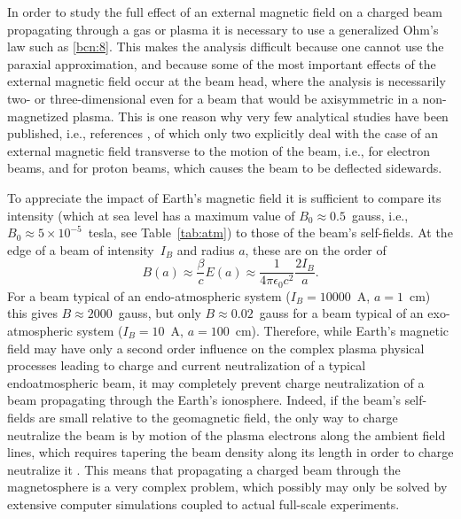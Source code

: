 \documentclass [12pt,a4paper,     ]{report} %
\begin{document}
   In order to study the full effect of an external magnetic field on a charged beam propagating through a gas or plasma it is necessary to  use a generalized Ohm's law such as \eqref{bcn:8}.  This makes the analysis difficult because one cannot use the paraxial approximation, and because some of the most important effects of the external magnetic field occur at the beam head, where the analysis is necessarily two- or three-dimensional even for a beam that would be axisymmetric in a non-magnetized plasma.  This is one reason why very few analytical studies have been published, i.e., references \cite{LEE--1971-, ROSIN1973-, CHU--1973-, BERK-1976-, CHRIE1986-}, of which only two explicitly deal with the case of an external magnetic field transverse to the motion of the beam, i.e., \cite{LEE--1971-} for electron beams, and \cite{CHRIE1986-} for proton beams, which causes the beam to be deflected sidewards. 

    To appreciate the impact of Earth's magnetic field it is sufficient to compare its intensity (which at sea level has a maximum value of $B_0 \approx 0.5$~gauss, i.e.,  $B_0 \approx 5\times 10^{-5}$~tesla, see Table~\ref{tab:atm}) to those of the beam's self-fields.  At the edge of a beam of intensity~$I_B$ and radius $a$, these are on the order of
%
\begin{equation}\label{mag:1} %
            B(a) \approx \frac{\beta}{c} E(a) 
                 \approx \frac{1}{4\pi\epsilon_0 c^2}\frac{2I_B}{a}.
\end{equation}
%
For a beam typical of an endo-atmospheric system ($I_B=10000$~A, $a=1$~cm) this gives $B \approx 2000$~gauss, but only  $B \approx 0.02$~gauss for a beam typical of an exo-atmospheric system ($I_B=10$~A, $a=100$~cm).  Therefore, while Earth's magnetic field may have only a second order influence on the complex plasma physical processes leading to charge and current neutralization of a typical endoatmospheric beam, it may completely prevent charge neutralization of a beam propagating through the Earth's ionosphere.  Indeed, if the beam's self-fields are small relative to the geomagnetic field, the only way to charge neutralize the beam is by motion of the plasma electrons along the ambient field lines, which requires tapering the beam density along its length in order to charge neutralize it \cite{CHRIE1986-}.  This means that propagating a charged beam through the magnetosphere is a very complex problem, which possibly may only be solved by extensive computer simulations coupled to actual full-scale experiments.
\end{document}
